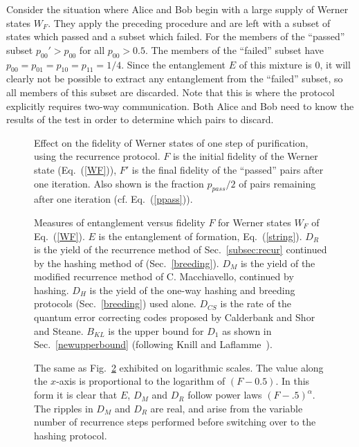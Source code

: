 Consider the situation where Alice and Bob begin with a large supply
of Werner states $W_F$.  They apply the preceding procedure and are
left with a subset of states which passed and a subset which failed.
For the members of the ``passed'' subset $p_{00}'>p_{00}$ for 
all $p_{00}>0.5$.
The members of the ``failed'' subset have
$p_{00}=p_{01}=p_{10}=p_{11}=1/4$.  Since the entanglement $E$ of this
mixture is 0, it will clearly not be possible to extract any
entanglement from the ``failed'' subset, so all members of this
subset are discarded.  Note that this is where the protocol explicitly
requires two-way communication.  Both Alice and Bob need to know the
results of the test in order to determine which pairs to discard.
 
 
\begin{figure}[p]
\caption[Recurrence graph]
{Effect on the fidelity of Werner states of one step of purification,
using the recurrence protocol.  $F$ is the initial fidelity of the Werner
state (Eq.~(\protect\ref{WF})), $F'$ is the final fidelity of the
``passed'' pairs after one iteration.  Also shown is the fraction
$p_{pass}/2$ of pairs remaining after one iteration (cf.
Eq.~(\protect\ref{ppass})).}
\label{recurchart}
\end{figure}

\begin{figure}[p]
\caption[Measures of entanglement versus
fidelity $F$ for Werner states $W_F$ of Eq.~(\protect\ref{WF})]
{Measures of entanglement versus
fidelity $F$ for Werner states $W_F$ of Eq.~(\protect\ref{WF}).  $E$
is the entanglement of formation, Eq.~(\protect\ref{string}).
$D_R$ is the
yield of the recurrence method of Sec.~\protect\ref{subsec:recur}
continued by the hashing method of
(Sec.~\protect\ref{breeding}). $D_M$ is the yield of the modified
recurrence method of C. Macchiavello\protect\cite{foot5}, continued by
hashing.  $D_H$ is the yield of the one-way hashing and breeding
protocols (Sec.~\protect\ref{breeding}) used alone. $D_{CS}$ is the
rate of the quantum error correcting codes proposed by Calderbank and
Shor\protect\cite{CS} and Steane\protect\cite{Steane}. 
$B_{KL}$ is
the upper bound for $D_1$ as shown in Sec.~\protect\ref{newupperbound} 
(following Knill and Laflamme~\protect\cite{lafknill}). 
\label{dchart}}
\end{figure}

\begin{figure}[p]
\caption[logchart.eps]
{The same as Fig.~\protect\ref{dchart} exhibited on logarithmic
scales.  The value along the $x$-axis is proportional
to the logarithm of $(F-0.5)$.
In this form it is clear that $E$, $D_M$ and $D_R$ follow
power laws $(F\!-\!.5)^\alpha$.  The ripples in $D_M$ and $D_R$ are real,
and arise from the variable number of recurrence steps performed
before switching over to the hashing protocol\protect\cite{purification}.
}
\label{logchart}
\end{figure}
 

